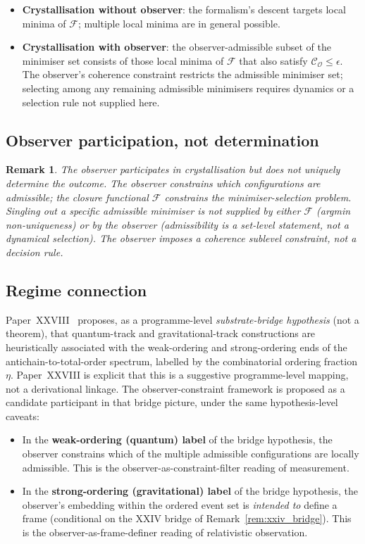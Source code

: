 \documentclass[12pt]{article}
\newtheorem{remark}[theorem]{Remark}
\newcommand{\Fcal}{\mathcal{F}}
\newcommand{\Ocal}{\mathcal{O}}
\newcommand{\Ccal}{\mathcal{C}}
\begin{document}
\begin{itemize}
    \item \textbf{Crystallisation without observer}: the formalism's descent targets local minima of $\Fcal$; multiple local minima are in general possible.
    \item \textbf{Crystallisation with observer}: the observer-admissible subset of the minimiser set consists of those local minima of $\Fcal$ that also satisfy $\Ccal_\Ocal \leq \epsilon$. The observer's coherence constraint restricts the admissible minimiser set; selecting among any remaining admissible minimisers requires dynamics or a selection rule not supplied here.
\end{itemize}

\subsection{Observer participation, not determination}

\begin{remark}
The observer participates in crystallisation but does not uniquely determine the outcome. The observer constrains which configurations are admissible; the closure functional $\Fcal$ constrains the minimiser-selection problem. Singling out a specific admissible minimiser is not supplied by either $\Fcal$ (argmin non-uniqueness) or by the observer (admissibility is a set-level statement, not a dynamical selection). The observer imposes a coherence sublevel constraint, not a decision rule.
\end{remark}

\subsection{Regime connection}

Paper~XXVIII~\citep{SmartXXVIII} proposes, as a programme-level \emph{substrate-bridge hypothesis} (not a theorem), that quantum-track and gravitational-track constructions are heuristically associated with the weak-ordering and strong-ordering ends of the antichain-to-total-order spectrum, labelled by the combinatorial ordering fraction $\eta$. Paper~XXVIII is explicit that this is a suggestive programme-level mapping, not a derivational linkage. The observer-constraint framework is proposed as a candidate participant in that bridge picture, under the same hypothesis-level caveats:

\begin{itemize}
    \item In the \textbf{weak-ordering (quantum) label} of the bridge hypothesis, the observer constrains which of the multiple admissible configurations are locally admissible. This is the observer-as-constraint-filter reading of measurement.
    \item In the \textbf{strong-ordering (gravitational) label} of the bridge hypothesis, the observer's embedding within the ordered event set is \emph{intended to} define a frame (conditional on the XXIV bridge of Remark~\ref{rem:xxiv_bridge}). This is the observer-as-frame-definer reading of relativistic observation.
\end{itemize}
\end{document}
